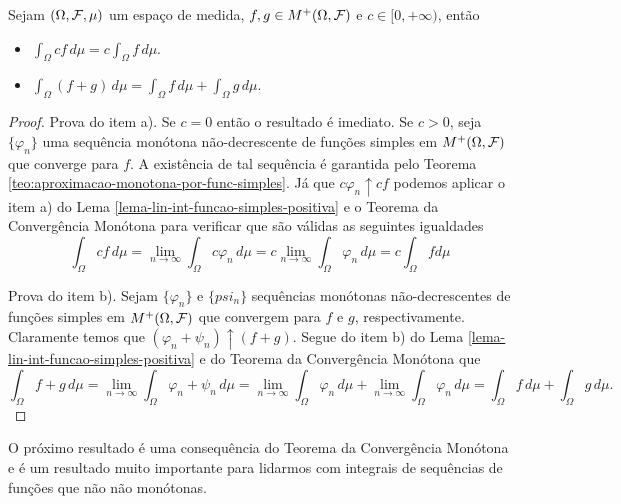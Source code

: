 \begin{corolario}
\label{cor-lin-int-funcao-simples-positiva}
Sejam $(\Omega,\mathcal{F},\mu)$ um espaço de medida, 
$f,g \in M^+(\Omega,\mathcal{F})$ e $c\in [0,+\infty)$,
então
\begin{itemize}
	\item[a)]
	\(\displaystyle 
		\int_{\Omega} c f\, d\mu
		=
		c\int_{\Omega} f \, d\mu.
	\)
	

	\item[b)]
	\(\displaystyle 
		\int_{\Omega} (f+g)\, d\mu
		=
		\int_{\Omega} f \, d\mu
		+
		\int_{\Omega} g \, d\mu.
	\)

\end{itemize}
\end{corolario}


\begin{proof}
Prova do item a). 
Se $c=0$ então o resultado é imediato.
Se $c>0$, seja $\{\varphi_n\}$ uma sequência 
monótona não-decrescente de funções simples em 
$M^{+}(\Omega,\mathcal{F})$ que converge para $f$.
A existência de tal sequência é garantida 
pelo Teorema \ref{teo:aproximacao-monotona-por-func-simples}.
Já que $c\varphi_n \uparrow cf$ podemos aplicar o item a) do
Lema \ref{lema-lin-int-funcao-simples-positiva} e
o Teorema da Convergência Monótona para verificar que 
são válidas as seguintes igualdades
	\[
	\int_{\Omega} cf\, d\mu
	=
	\lim_{n\to\infty} \int_{\Omega} c\varphi_n\, d\mu
	=
	c\lim_{n\to\infty} \int_{\Omega} \varphi_n\, d\mu	
	=
	c\int_{\Omega} f d\mu		
	\] 



Prova do item b). Sejam 
$\{\varphi_n\}$ e $\{psi_n\}$ sequências
monótonas não-decrescentes de funções simples em 
$M^{+}(\Omega,\mathcal{F})$ que convergem para $f$ e $g$,
respectivamente. Claramente temos que 
$(\varphi_n+\psi_n) \uparrow (f+g)$.
Segue do item b) do 
Lema \ref{lema-lin-int-funcao-simples-positiva}
e do Teorema da Convergência Monótona que 
	\[
	\int_{\Omega} f+g\, d\mu
	=
	\lim_{n\to\infty} \int_{\Omega} \varphi_n+\psi_n\, d\mu
	=
	\lim_{n\to\infty} \int_{\Omega} \varphi_n\, d\mu
	+		
	\lim_{n\to\infty} \int_{\Omega} \varphi_n\, d\mu	
	=
	\int_{\Omega} f\, d\mu+\int_{\Omega} g\, d\mu.
	\] 
\end{proof}




O próximo resultado é uma consequência do Teorema 
da Convergência Monótona e é um resultado muito 
importante para lidarmos com integrais de sequências
de funções que não não monótonas.







